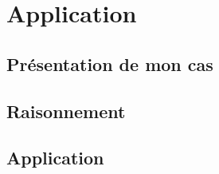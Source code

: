 
\chapter{Application} %

\label{Chapter3} %


\section{Présentation de mon cas}


\section{Raisonnement}


\section{Application}